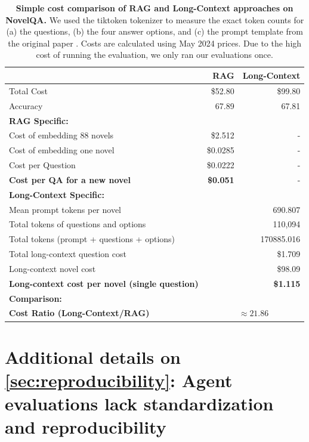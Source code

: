 \documentclass{article}
\begin{document}
\begin{table}
\centering
\begin{tabular}{lrr} 
\toprule
 & RAG & Long-Context \\
\midrule
Total Cost & \$52.80 & \$99.80 \\
Accuracy & 67.89 & 67.81 \\
\midrule
\multicolumn{3}{l}{\textbf{RAG Specific:}} \\
Cost of embedding 88 novels & \$2.512 & - \\
Cost of embedding one novel & \$0.0285 & - \\
Cost per Question & \$0.0222 & - \\
\textbf{Cost per QA for a new novel} & \textbf{\$0.051} & - \\
\midrule
\multicolumn{3}{l}{\textbf{Long-Context  Specific:}} \\
Mean prompt tokens per novel &  & 690.807 \\
Total tokens of questions and options & & 110,094 \\
Total tokens (prompt + questions + options) &  &  170885.016 \\
Total long-context question cost & & \$1.709 \\
Long-context novel cost &  & \$98.09 \\
\textbf{Long-context cost per novel (single question)} &  & \textbf{\$1.115} \\
\midrule
\multicolumn{3}{l}{\textbf{Comparison:}} \\
\textbf{Cost Ratio (Long-Context/RAG)} & \multicolumn{2}{c}{$\approx 21.86$} \\
\bottomrule
\end{tabular}
\vspace{0.2cm}
\caption{\textbf{Simple cost comparison of RAG and Long-Context approaches on NovelQA.} We used the tiktoken tokenizer to measure the exact token counts for (a) the questions, (b) the four answer options, and (c) the prompt template from the original paper \citep{wang_novelqa_2024}. Costs are calculated using May 2024 prices. Due to the high cost of running the evaluation, we only ran our evaluations once.}
\label{appendix:tab:novelqa-cost}
\end{table}



\section{Additional details on \cref{sec:reproducibility}: Agent evaluations lack standardization and reproducibility}
\label{appendix:reproducibility}
\end{document}
